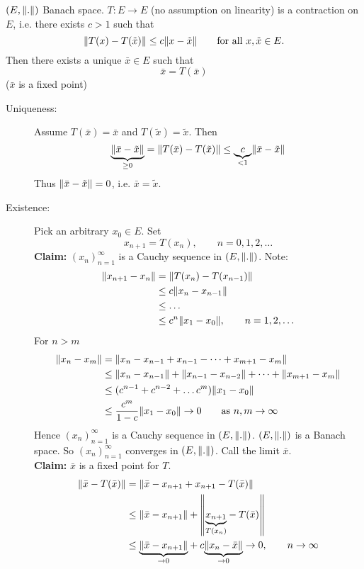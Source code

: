 \begin{theorem}
	$(E, \norm{.})$ Banach space. $T: E \to E$ (no assumption on linearity) is a contraction on $E$, i.e. there exists $c>1$ such that
	\[
		\norm{T(x)-T(\tilde x)} \leq c \norm{x- \tilde x} \qquad \text{for all }x,\tilde x \in E.
	\]
	Then there exists a unique $ \bar{x} \in E$ such that 
	\[
		\bar{x} = T( \bar{ x})
	\]
	($\bar{x}$ is a fixed point)
\end{theorem}
\begin{beweis}
	\begin{description}
		\item[Uniqueness:]Assume $T( \bar{x}) = \bar{x}$ and $T ( \tilde x) = \tilde x$. Then
		\[
			\underset{\geq 0}{\underbrace{\norm{ \bar{ x} - \tilde x }}} = \norm{T( \bar{x})- T( \tilde x)} \leq \underset{< 1}{\underbrace{c}} \norm{ \bar{x}- \tilde x}
		\] 
		Thus $\norm{\bar{x}- \tilde x} = 0$, i.e. $\bar{x} = \tilde x$.
		\item[Existence:] Pick an arbitrary $x_0 \in E$. Set
		\[
			x_{n+1} = T(x_{n}), \qquad n=0,1,2,\dots
		\]
		\textbf{Claim:} \text{    }     $(x_n)_{n=1}^{\infty}$ is a Cauchy sequence in $(E,\norm{.})$.
		Note:
		\begin{align*}
			\norm{x_{n+1}-x_n}  &= \norm{T(x_n)-T(x_{n-1})} \\
			&\leq  c \norm{x_n - x_{n-1}} \\
			&\leq \dots \\
			&\leq  c^n \norm{x_1-x_0}, \qquad n=1,2,\dots 
		\end{align*}
		For $n>m$
		\begin{align*}
			\norm{x_n-x_m} &= \norm{x_n - x_{n-1}+ x_{n-1}- \dots + x_{m+1}- x_m} \\
			&\leq \norm{x_n - x_{n-1}} + \norm{x_{n-1} - x_{n-2}} + \dots + \norm{x_{m+1}- x_m} \\
			&\leq (c^{n-1}+ c^{n-2} + \dots c^m) \norm{x_1-x_0} \\
			&\leq \frac{c^m}{1-c} \norm{x_1 - x_0} \to 0 \qquad \text{as }n,m \to \infty
		\end{align*}
		Hence $(x_n)_{n=1}^{\infty}$ is a Cauchy sequence in $(E,\norm{.})$. $(E, \norm{.})$ is a Banach space. So $(x_n)_{n=1}^{\infty}$ converges in $(E,\norm{.})$. Call the limit $\bar{x}$. \\
		\textbf{Claim:} \text{    }     $\bar{x}$ is a fixed point for $T$. 
		\begin{align*}
			\norm{\bar{ x}- T(\bar{x})} & = \norm{\bar{x}-x_{n+1}+ x_{n+1} - T(\bar{x})} \\
			&\leq \norm{\bar{x}-x_{n+1}} + \norm{\underset{T(x_n)}{\underbrace{x_{n+1}}} - T(\bar{x})} \\
			&\leq \underset{\to 0}{\underbrace{\norm{\bar{x}- x_{n+1}}}} + c \underset{\to 0}{\underbrace{\norm{x_n - \bar{x}}}} \to 0, \qquad n \to \infty
		\end{align*}
	\end{description}
\end{beweis}
